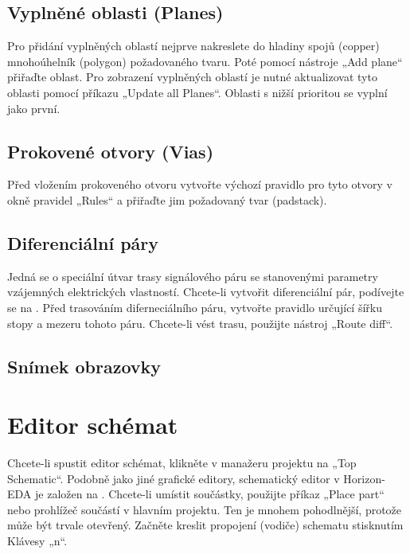 \documentclass[letterpaper,10pt,czech]{sphinxmanual}
\begin{document}
\section{Vyplněné oblasti (Planes)}
\label{\detokenize{imp-board_cz:vyplnene-oblasti-planes}}
Pro přidání vyplněných oblastí nejprve nakreslete do hladiny spojů (copper) mnohoúhelník (polygon) požadovaného tvaru. Poté pomocí nástroje „Add plane“ přiřaďte oblast. Pro zobrazení vyplněných oblastí je nutné aktualizovat tyto oblasti pomocí příkazu „Update all Planes“. Oblasti s
nižší prioritou se vyplní jako první.


\section{Prokovené otvory (Vias)}
\label{\detokenize{imp-board_cz:prokovene-otvory-vias}}
Před vložením prokoveného otvoru vytvořte výchozí pravidlo pro tyto otvory v okně pravidel „Rules“
a přiřaďte jim požadovaný tvar (padstack).


\section{Diferenciální páry}
\label{\detokenize{imp-board_cz:diferencialni-pary}}
Jedná se o speciální útvar trasy signálového páru se stanovenými parametry vzájemných elektrických vlastností. Chcete-li vytvořit diferenciální pár, podívejte se na {\hyperref[\detokenize{imp-sch_cz:diferencialni-pary}]{}}. Před trasováním diferneciálního páru, vytvořte pravidlo určující šířku stopy a mezeru tohoto páru. Chcete-li vést trasu, použijte nástroj „Route diff“.


\section{Snímek obrazovky}
\label{\detokenize{imp-board_cz:snimek-obrazovky}}
\noindent{}


\chapter{Editor schémat}
\label{\detokenize{imp-sch_cz:editor-schemat}}\label{\detokenize{imp-sch_cz::doc}}
Chcete-li spustit editor schémat, klikněte v manažeru projektu na „Top Schematic“. Podobně jako jiné grafické editory, schematický editor v Horizon-EDA je založen na {\hyperref[\detokenize{imp_cz::doc}]{}}. Chcete-li umístit součástky, použijte příkaz „Place part“ nebo prohlížeč součástí v hlavním projektu. Ten je mnohem pohodlnější, protože může být trvale otevřený. Začněte kreslit propojení (vodiče) schematu stisknutím Klávesy „n“.
\end{document}
